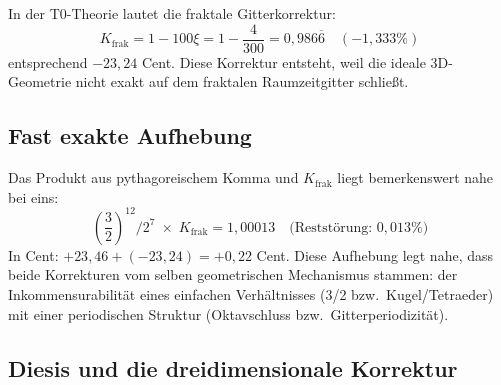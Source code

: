 In der T0-Theorie lautet die fraktale Gitterkorrektur:
\begin{equation}
	K_\text{frak} = 1 - 100\xi = 1 - \frac{4}{300} = 0{,}986\overline{6} \quad (-1{,}333\%)
\end{equation}
entsprechend $-23{,}24$ Cent. Diese Korrektur entsteht, weil die ideale 3D-Geometrie nicht exakt auf dem fraktalen Raumzeitgitter schließt.

\subsection{Fast exakte Aufhebung}

Das Produkt aus pythagoreischem Komma und $K_\text{frak}$ liegt bemerkenswert nahe bei eins:
\begin{equation}
	\left(\frac{3}{2}\right)^{12} \Big/ 2^7 \;\times\; K_\text{frak} = 1{,}00013 \quad \text{(Reststörung: } 0{,}013\%\text{)}
\end{equation}
In Cent: $+23{,}46 + (-23{,}24) = +0{,}22$ Cent. Diese Aufhebung legt nahe, dass beide Korrekturen vom selben geometrischen Mechanismus stammen: der Inkommensurabilität eines einfachen Verhältnisses (3/2 bzw.\ Kugel/Tetraeder) mit einer periodischen Struktur (Oktavschluss bzw.\ Gitterperiodizität).

\begin{table}[h]
\centering
{}
\caption{Musikalische Kommata und T0-Korrekturen im Vergleich.}
\label{tab:kommas}
\end{table}

\subsection{Diesis und die dreidimensionale Korrektur}


